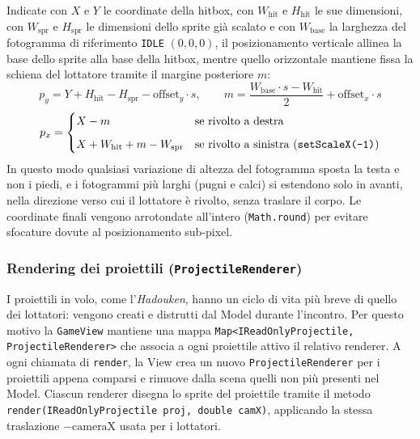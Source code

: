 \documentclass[11pt, a4paper]{article}
\begin{document}
	Indicate con $X$ e $Y$ le coordinate della hitbox, con $W_{\text{hit}}$ e $H_{\text{hit}}$ le sue dimensioni, con $W_{\text{spr}}$ e $H_{\text{spr}}$ le dimensioni dello sprite già scalato e con $W_{\text{base}}$ la larghezza del fotogramma di riferimento \texttt{IDLE} $(0, 0, 0)$, il posizionamento verticale allinea la base dello sprite alla base della hitbox, mentre quello orizzontale mantiene fissa la schiena del lottatore tramite il margine posteriore $m$:
	\begin{equation}
		p_y = Y + H_{\text{hit}} - H_{\text{spr}} - \text{offset}_y \cdot s, \qquad
		m = \frac{W_{\text{base}} \cdot s - W_{\text{hit}}}{2} + \text{offset}_x \cdot s
	\end{equation}
	\begin{equation}
		p_x =
		\begin{cases}
			X - m & \text{se rivolto a destra} \\[6pt]
			X + W_{\text{hit}} + m - W_{\text{spr}} & \text{se rivolto a sinistra (\texttt{setScaleX(-1)})}
		\end{cases}
	\end{equation}
	In questo modo qualsiasi variazione di altezza del fotogramma sposta la testa e non i piedi, e i fotogrammi più larghi (pugni e calci) si estendono solo in avanti, nella direzione verso cui il lottatore è rivolto, senza traslare il corpo. Le coordinate finali vengono arrotondate all'intero (\texttt{Math.round}) per evitare sfocature dovute al posizionamento sub-pixel.
	
	\subsubsection{Rendering dei proiettili (\texttt{ProjectileRenderer})}
	I proiettili in volo, come l'\emph{Hadouken}, hanno un ciclo di vita più breve di quello dei lottatori: vengono creati e distrutti dal Model durante l'incontro. Per questo motivo la \texttt{GameView} mantiene una mappa \texttt{Map<IReadOnlyProjectile, ProjectileRenderer>} che associa a ogni proiettile attivo il relativo renderer. A ogni chiamata di \texttt{render}, la View crea un nuovo \texttt{ProjectileRenderer} per i proiettili appena comparsi e rimuove dalla scena quelli non più presenti nel Model. Ciascun renderer disegna lo sprite del proiettile tramite il metodo \texttt{render(IReadOnlyProjectile proj, double camX)}, applicando la stessa traslazione $-\text{cameraX}$ usata per i lottatori.
	
\end{document}
